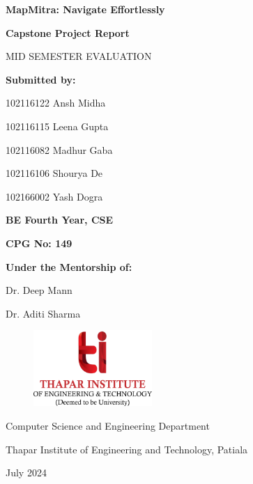 \documentclass[a4paper,12pt]{report}
\begin{document}
\begin{titlepage}
    \centering    
    {\Huge\bfseries MapMitra: Navigate Effortlessly \par} %
    
    \vspace{1cm}
    {\Large\bfseries Capstone Project Report \par}
    {\Large MID SEMESTER EVALUATION \par}
    
    \vspace{1cm}
    {\large \bfseries Submitted by: \par}
    {\large 102116122 Ansh Midha \par}
    {\large 102116115 Leena Gupta \par}
    {\large 102116082 Madhur Gaba \par}
    {\large 102116106 Shourya De \par}
    {\large 102166002 Yash Dogra \par}
    \vspace{0.25cm}
    {\large \bfseries BE Fourth Year, CSE \par}
    {\large \bfseries CPG No: 149 \par}
    
    \vspace{1.5cm}
    {\large \bfseries Under the Mentorship of: \par}
    {\large Dr. Deep Mann \par}
    {\large Dr. Aditi Sharma \par}
    
    \vspace{0.5cm}
    \begin{figure}[h!]
        \centering
        \includegraphics[width=0.4\textwidth]{tietlogo-CjxYgEfJ.png}
    \end{figure}
    

    \vfill
    \bfseries{
    {\large Computer Science and Engineering Department \par}
    {\large Thapar Institute of Engineering and Technology, Patiala \par}
    {\large July 2024 \par}
    }
\end{titlepage}
\end{document}
